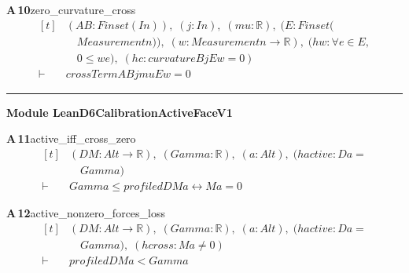 \documentclass[conference]{IEEEtran}
\theoremstyle{definition}
\newcommand{\lean}[1]{\textsf{\footnotesize #1}}
\begin{document}
\noindent\textbf{A\,10}\quad\lean{zero\_curvature\_cross}
{\footnotesize\[ \begin{aligned}[t]
&(\mathit{A} \mathit{B} : \mathit{Finset} (\mathit{I} \mathit{n})),\; (\mathit{j} : \mathit{I} \mathit{n}),\; (\mathit{mu} : \mathbb{R} ),\; (\mathit{E} : \mathit{Finset} (\\
&\quad \mathit{Measurement} \mathit{n})),\; (\mathit{w} : \mathit{Measurement} \mathit{n} \to \mathbb{R} ),\; (\mathit{hw} : \forall \mathit{e} \in \mathit{E},\\
&\quad 0 \leq \mathit{w} \mathit{e}),\; (\mathit{hc} : \mathit{curvature} \mathit{B} \mathit{j} \mathit{E} \mathit{w}=0)\\
\vdash\;&\mathit{crossTerm} \mathit{A} \mathit{B} \mathit{j} \mathit{mu} \mathit{E} \mathit{w}=0
\end{aligned} \]}

\vspace{4pt}\noindent\rule{\columnwidth}{0.4pt}\par\vspace{2pt}
\noindent\textbf{Module \lean{LeanD6CalibrationActiveFaceV1}}\par\vspace{3pt}

\noindent\textbf{A\,11}\quad\lean{active\_iff\_cross\_zero}
{\footnotesize\[ \begin{aligned}[t]
&(\mathit{D} \mathit{M} : \mathit{Alt} \to \mathbb{R} ),\; (\mathit{Gamma} : \mathbb{R} ),\; (\mathit{a} : \mathit{Alt}),\; (\mathit{hactive} : \mathit{D} \mathit{a} =\\
&\quad \mathit{Gamma})\\
\vdash\;&\mathit{Gamma} \leq \mathit{profiled} \mathit{D} \mathit{M} \mathit{a} \leftrightarrow \mathit{M} \mathit{a} = 0
\end{aligned} \]}

\noindent\textbf{A\,12}\quad\lean{active\_nonzero\_forces\_loss}
{\footnotesize\[ \begin{aligned}[t]
&(\mathit{D} \mathit{M} : \mathit{Alt} \to \mathbb{R} ),\; (\mathit{Gamma} : \mathbb{R} ),\; (\mathit{a} : \mathit{Alt}),\; (\mathit{hactive} : \mathit{D} \mathit{a} =\\
&\quad \mathit{Gamma}),\; (\mathit{hcross} : \mathit{M} \mathit{a} \neq 0)\\
\vdash\;&\mathit{profiled} \mathit{D} \mathit{M} \mathit{a} < \mathit{Gamma}
\end{aligned} \]}
\end{document}
